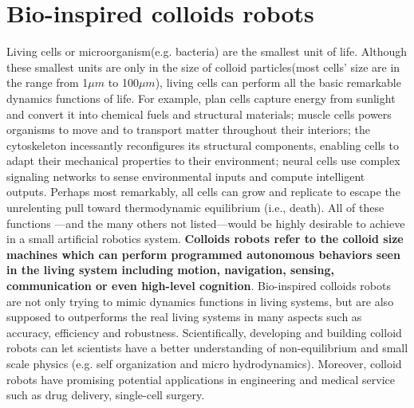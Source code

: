 \section{Bio-inspired colloids robots}
Living cells or microorganism(e.g. bacteria) are the smallest unit of life. Although these smallest units are only in the size of colloid particles(most cells' size are in the range from 1$\mu m$ to 100$\mu m$), living cells can perform all the basic remarkable dynamics functions of life. For example, plan cells capture energy from sunlight and convert it into chemical fuels and structural materials; muscle cells powers organisms to move and to transport matter throughout their interiors; the cytoskeleton incessantly reconfigures its structural components, enabling cells to adapt their mechanical properties to their environment; neural cells use complex signaling networks to sense environmental inputs and compute intelligent outputs. Perhaps most remarkably, all cells can grow and replicate to escape the unrelenting pull toward thermodynamic equilibrium (i.e., death).  All of these functions ---and the many others not listed---would be highly desirable to achieve in a small artificial robotics system. 
\textbf{Colloids robots refer to the colloid size machines which can perform  programmed autonomous behaviors seen in the living system including motion, navigation, sensing, communication or even high-level cognition}. Bio-inspired colloids robots are not only trying to mimic dynamics functions in living systems, but  are also supposed to outperforms the real living systems in many aspects such as accuracy, efficiency and robustness. Scientifically, developing and building colloid robots can let scientists have a better understanding of non-equilibrium and small scale physics (e.g. self organization and micro hydrodynamics). Moreover, colloid robots have promising potential applications in engineering and medical service such as drug delivery, single-cell surgery. 

